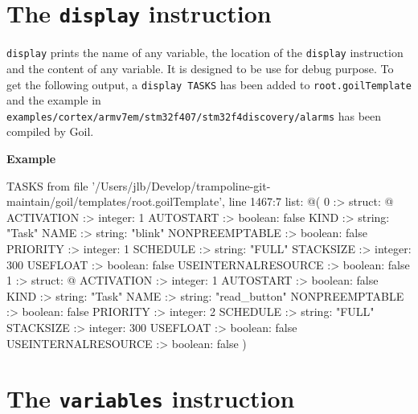\documentclass[10pt,openright,twosides,final]{memoir}
\newcommand{\gtlinline}[1]{\colorbox{light-blue}{\lstinline[language=gtl]{#1}}}
\newcommand{\example}{\vspace{.75em}\noindent\textbf{Example}\vspace{0em}}
\begin{document}
\section{The \texttt{display} instruction}

\gtlinline{display} prints the name of any variable, the location of the \gtlinline{display} instruction and the content of any variable. It is designed to be use for debug purpose. To get the following output, a \gtlinline{display TASKS} has been added to \texttt{\footnotesize root.goilTemplate} and the example in \texttt{\footnotesize examples/cortex/\-armv7em/stm32f407/stm32f4discovery/alarms} has been compiled by Goil.

\example
\begin{console}
TASKS from file '/Users/jlb/Develop/trampoline-git-maintain/goil/templates/root.goilTemplate', line 1467:7
    list: @(
        0 :>
            struct: @{
                ACTIVATION :>
                    integer: 1
                AUTOSTART :>
                    boolean: false
                KIND :>
                    string: "Task"
                NAME :>
                    string: "blink"
                NONPREEMPTABLE :>
                    boolean: false
                PRIORITY :>
                    integer: 1
                SCHEDULE :>
                    string: "FULL"
                STACKSIZE :>
                    integer: 300
                USEFLOAT :>
                    boolean: false
                USEINTERNALRESOURCE :>
                    boolean: false
            }
        1 :>
            struct: @{
                ACTIVATION :>
                    integer: 1
                AUTOSTART :>
                    boolean: false
                KIND :>
                    string: "Task"
                NAME :>
                    string: "read_button"
                NONPREEMPTABLE :>
                    boolean: false
                PRIORITY :>
                    integer: 2
                SCHEDULE :>
                    string: "FULL"
                STACKSIZE :>
                    integer: 300
                USEFLOAT :>
                    boolean: false
                USEINTERNALRESOURCE :>
                    boolean: false
            }
    )
\end{console}

\section{The \texttt{variables} instruction}
\end{document}
